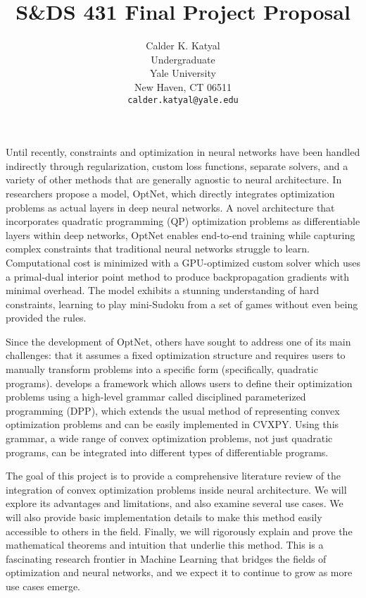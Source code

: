 \documentclass{article}
\title{S\&DS 431 Final Project Proposal}
\author{%
  Calder K. Katyal\\
  Undergraduate\\
  Yale University\\
  New Haven, CT 06511 \\
  \texttt{calder.katyal@yale.edu} \\
}
\begin{document}
\maketitle

Until recently, constraints and optimization in neural networks have been handled indirectly through regularization, custom loss functions, separate solvers, and a variety of other methods that are generally agnostic to neural architecture. In \citet{optnet} researchers propose a model, OptNet, which directly integrates optimization problems as actual layers in deep neural networks. A novel architecture that incorporates quadratic programming (QP) optimization problems as differentiable layers within deep networks, OptNet enables end-to-end training while capturing complex constraints that traditional neural networks struggle to learn. Computational cost is minimized with a GPU-optimized custom solver which uses a primal-dual interior point method to produce backpropagation gradients with minimal overhead. The model exhibits a stunning understanding of hard constraints, learning to play mini-Sudoku from a set of games without even being provided the rules. 

Since the development of OptNet, others have sought to address one of its main challenges: that it assumes a fixed optimization structure and requires users to manually transform problems into a specific form (specifically, quadratic programs). \citet{differentiableconvexoptimizationlayers} develops a framework which allows users to define their optimization problems using a high-level grammar called disciplined parameterized programming (DPP), which extends the usual method of representing convex optimization problems and can be easily implemented in CVXPY. Using this grammar, a wide range of convex optimization problems, not just quadratic programs, can be integrated into different types of differentiable programs. 

The goal of this project is to provide a comprehensive literature review of the integration of convex optimization problems inside neural architecture. We will explore its advantages and limitations, and also examine several use cases. We will also provide basic implementation details to make this method easily accessible to others in the field. Finally, we will rigorously explain and prove the mathematical theorems and intuition that underlie this method. This is a fascinating research frontier in Machine Learning that bridges the fields of optimization and neural networks, and we expect it to continue to grow as more use cases emerge.


\small


\end{document}
